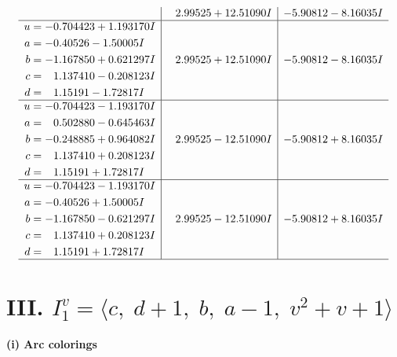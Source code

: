 \documentclass[1p]{elsarticle_modified}
\theoremstyle{definition}
\begin{document}
$$\begin{array}{c|c|c}
 & \phantom{-}2.99525 + 12.51090 I & -5.90812 - 8.16035 I \\ \hline\begin{aligned}
u &= -0.704423 + 1.193170 I \\
a &= -0.40526 - 1.50005 I \\
b &= -1.167850 + 0.621297 I \\
c &= \phantom{-}1.137410 - 0.208123 I \\
d &= \phantom{-}1.15191 - 1.72817 I\end{aligned}
 & \phantom{-}2.99525 + 12.51090 I & -5.90812 - 8.16035 I \\ \hline\begin{aligned}
u &= -0.704423 - 1.193170 I \\
a &= \phantom{-}0.502880 - 0.645463 I \\
b &= -0.248885 + 0.964082 I \\
c &= \phantom{-}1.137410 + 0.208123 I \\
d &= \phantom{-}1.15191 + 1.72817 I\end{aligned}
 & \phantom{-}2.99525 - 12.51090 I & -5.90812 + 8.16035 I \\ \hline\begin{aligned}
u &= -0.704423 - 1.193170 I \\
a &= -0.40526 + 1.50005 I \\
b &= -1.167850 - 0.621297 I \\
c &= \phantom{-}1.137410 + 0.208123 I \\
d &= \phantom{-}1.15191 + 1.72817 I\end{aligned}
 & \phantom{-}2.99525 - 12.51090 I & -5.90812 + 8.16035 I\\
 \hline 
 \end{array}$$\newpage\newpage\renewcommand{\arraystretch}{1}
\centering \section*{III. $I^v_{1}= \langle c,\;d+1,\;b,\;a-1,\;v^2+v+1 \rangle$}
\flushleft \textbf{(i) Arc colorings}\\
\end{document}
